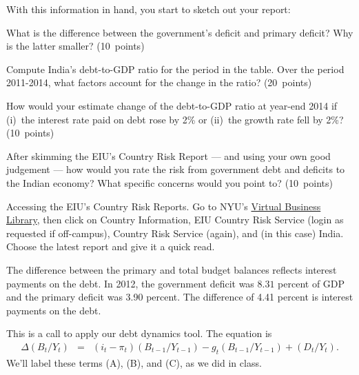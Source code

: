 \documentclass[12pt]{exam}
\begin{document}
\begin{questions}
With this information in hand, you start to sketch out your report:
\begin{parts}
\item What is the difference between the government's deficit and primary deficit?
Why is the latter smaller?
(10~points)

\item Compute India's debt-to-GDP ratio for the period in the table.
Over the period 2011-2014, what factors account for the change in the ratio?
(20~points)

\item
How would your estimate change of the debt-to-GDP ratio at year-end 2014
if  (i)~the interest rate paid on debt rose by 2\%
or (ii)~the growth rate fell by 2\%?
(10~points)

\item
After skimming the EIU's Country Risk Report ---
and using your own good judgement ---
how would you rate the risk from government debt and deficits
to the Indian economy?
What specific concerns would you point to?
(10~points)
\end{parts}

Accessing the EIU's Country Risk Reports.
Go to NYU's
\href{http://library.nyu.edu/vbl/}{Virtual Business Library},
then click on Country Information,
EIU Country Risk Service (login as requested if off-campus),
Country Risk Service (again), and (in this case) India.
Choose the latest report and give it a quick read.


\begin{solution}
\begin{parts}
\item The difference between the primary and total budget balances
reflects interest payments on the debt.
In 2012,
the government deficit was $8.31$ percent of GDP
and the primary deficit was 3.90 percent.
The difference of 4.41 percent is interest payments on the debt.

\item This is a call to apply our debt dynamics tool.
The equation is
\begin{eqnarray*}
    \Delta ({B_{t}}/{Y_{t}})
            &=&
                (i_t-\pi_t) ({B_{t-1}}/{Y_{t-1}})
                - g_t ({B_{t-1}}/{Y_{t-1}})
             +    ({D_{t}}/{Y_{t}})  .
\end{eqnarray*}
We'll label these terms (A), (B), and (C), as we did in class.


\end{parts}
\end{solution}
\end{questions}
\end{document}
